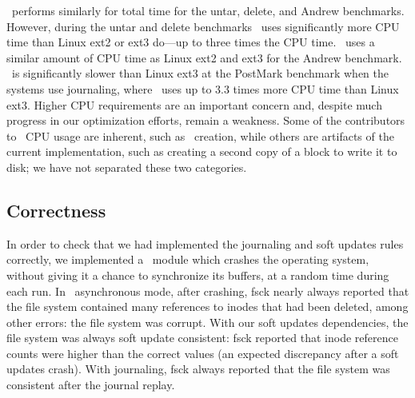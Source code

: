 \Kudos\ performs similarly for total time for the untar, delete, and
Andrew benchmarks. However, during the untar and delete benchmarks
\Kudos\ uses significantly more CPU time than Linux ext2 or ext3
do---up to three times the CPU time. \Kudos\ uses a similar amount of
CPU time as Linux ext2 and ext3 for the Andrew benchmark.
%
\Kudos\ is significantly slower than Linux ext3 at the PostMark
benchmark when the systems use journaling, where \Kudos\ uses up to
3.3 times more CPU time than Linux ext3.
%
Higher CPU requirements are an important concern and, despite much progress
in our optimization efforts, remain a weakness.
%
Some of the contributors to \Kudos\ CPU usage are inherent, such as
\patch\ creation, while others are artifacts of the current
implementation, such as creating a second copy of a block to write it to
disk; we have not separated these two categories.
%
%
\begin{comment}
Further, while \Kudos\ I/O times are lower than Linux ext2/ext3 I/O
times for the untar and delete benchmarks, we have found that small
block allocation strategy changes can significantly affect I/O time
for many of these benchmarks. This further emphasizes the importance
of the system CPU time difference.
\end{comment}

\begin{comment}
Unlike the untar, delete, and Andrew benchmarks, Linux ext3 writeback
and journal modes outperform \Kudos\ meta journal and full journal
modes, respectively, at PostMark.
\end{comment}


\subsection {Correctness}
\label{sec:eval:correctness}

In order to check that we had implemented the journaling and soft updates
rules correctly,
we implemented a \Kudos\ module which crashes the operating system, without
giving it a chance to synchronize its buffers, at a random time during each
run.
%
In \Kudos\ asynchronous mode, after crashing, fsck nearly always reported
that the file system contained many references to inodes that had been
deleted, among other errors: the file system was corrupt.
%
With our soft updates dependencies, the file system was always soft update
consistent: fsck reported that inode reference counts were higher than the
correct values (an expected discrepancy after a soft updates crash).
%
With journaling, fsck always reported that the file system was
consistent after the journal replay.

